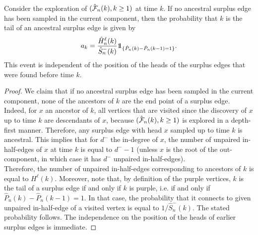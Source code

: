 \begin{lemma}\label{lemma.probancestral}
Consider the exploration of $(\hat{{\mathcal F}}_n(k),k\geq 1)$ at time $k$. If no ancestral surplus edge has been sampled in the current component, then the probability that $k$ is the tail of an ancestral surplus edge is given by 
$$a_k=\frac{\hat{H}^\ell_n(k)}{\hat{S}_n^-(k)}\one_{\{\hat{P}_n(k)-\hat{P}_n(k-1)=1\}}.$$
This event is independent of the position of the heads of the surplus edges that were found before time $k$.
\end{lemma}
\begin{proof}
We claim that if no ancestral surplus edge has been sampled in the current component, none of the ancestors of $k$ are the end point of a surplus edge. Indeed, for $x$ an ancestor of $k$, all vertices that are visited since the discovery of $x$ up to time $k$ are descendants of $x$, because $(\hat{{\mathcal F}}_n(k),k\geq 1)$ is explored in a depth-first manner. Therefore, any surplus edge with head $x$ sampled up to time $k$ is ancestral. This implies that for $d^-$ the in-degree of $x$, the number of unpaired in-half-edges of $x$ at time $k$ is equal to $d^--1$ (unless $x$ is the root of the out-component, in which case it has $d^-$ unpaired in-half-edges).\\
Therefore, the number of unpaired in-half-edges corresponding to ancestors of $k$ is equal to $H^\ell(k)$. Moreover, note that, by definition of the purple vertices, $k$ is the tail of a surplus edge if and only if $k$ is purple, i.e. if and only if $\hat{P}_n(k)-\hat{P}_n(k-1)=1$. In that case, the probability that it connects to given unpaired in-half-edge of a visited vertex is equal to $1/\hat{S}_n^-(k)$. The stated probability follows. The independence on the position of the heads of earlier surplus edges is immediate.
\end{proof}\\

